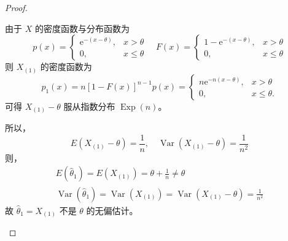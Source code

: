\documentclass[normal,founder,mtpro2,cn]{elegantnote}
\begin{document}
\begin{enumerate}
\begin{proof}
\begin{enumerate}
                      由于 $X$ 的密度函数与分布函数为
                      \begin{equation*}
                          p(x)=\left\{\begin{array}{ll}
                              \mathrm{e}^{-(x-\theta)}, & x>\theta      \\
                              0,                        & x \leq \theta
                          \end{array}\right.\quad
                          F(x)=\left\{\begin{array}{ll}
                              1-\mathrm{e}^{-(x-\theta)}, & x>\theta      \\
                              0,                          & x \leq \theta
                          \end{array}\right.
                      \end{equation*}
                      则 $X_{(1)}$ 的密度函数为
                      $$
                          p_{1}(x)=n[1-F(x)]^{n-1}p(x)=\left\{\begin{array}{ll}
                              n \mathrm{e}^{-n(x-\theta)}, & x>\theta        \\
                              0,                           & x \leq \theta .
                          \end{array}\right.
                      $$
                      可得 $X_{(1)}-\theta$ 服从指数分布 $\operatorname{Exp}(n)$。

                      所以，
                      \begin{equation*}
                          E\left(X_{(1)}-\theta\right)=\frac{1}{n},\quad\operatorname{Var}\left(X_{(1)}-\theta\right)=\frac{1}{n^{2}}
                      \end{equation*}
                      则，
                      \begin{gather*}
                          E\left(\hat{\theta}_{1}\right)=E\left(X_{(1)}\right)=\theta+\frac{1}{n}\neq\theta \\
                          \operatorname{Var}\left(\hat{\theta}_{1}\right)=\operatorname{Var}\left(X_{(1)}\right)=\operatorname{Var}\left(X_{(1)}-\theta\right)=\frac{1}{n^{2}}
                      \end{gather*}
                      故 $\hat{\theta}_{1}=X_{(1)}$ 不是 $\theta$ 的无偏估计。


\end{enumerate}
\end{proof}
\end{enumerate}
\end{document}
